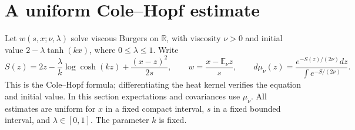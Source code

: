\documentclass[11pt]{article}
\newcommand{\E}{\mathbb E}
\newcommand{\R}{\mathbb R}
\begin{document}
\section{A uniform Cole--Hopf estimate}
Let $w(s,x;\nu,\lambda)$ solve viscous Burgers on $\R$, with viscosity $\nu>0$ and initial value $2-\lambda\tanh(kx)$, where $0\le\lambda\le1$. Write
\begin{equation}\label{action}
 S(z)=2z-\frac\lambda k\log\cosh(kz)+\frac{(x-z)^2}{2s},\qquad
 w=\frac{x-\E_\nu z}{s},\qquad
 d\mu_\nu(z)=\frac{e^{-S(z)/(2\nu)}dz}{\int e^{-S/(2\nu)}}.
\end{equation}
This is the Cole--Hopf formula; differentiating the heat kernel verifies the equation and initial value. In this section expectations and covariances use $\mu_\nu$. All estimates are uniform for $x$ in a fixed compact interval, $s$ in a fixed bounded interval, and $\lambda\in[0,1]$. The parameter $k$ is fixed.
\end{document}
